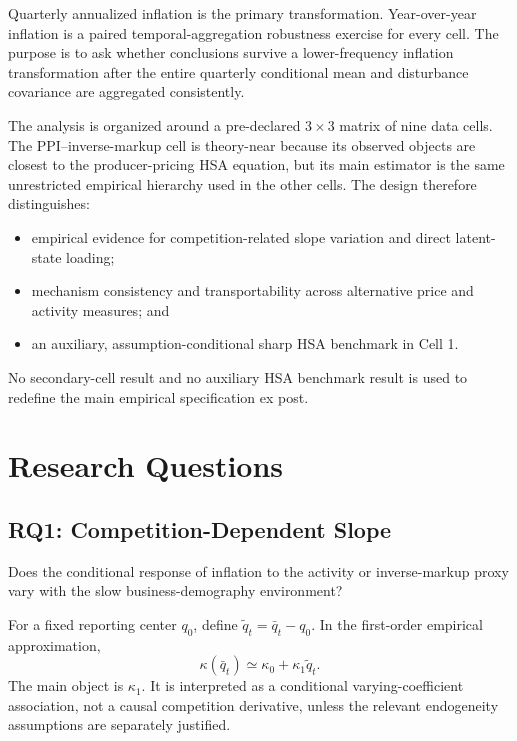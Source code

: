 \documentclass[11pt]{article}
\begin{document}
Quarterly annualized inflation is the primary transformation. Year-over-year inflation is a paired temporal-aggregation robustness exercise for every cell. The purpose is to ask whether conclusions survive a lower-frequency inflation transformation after the entire quarterly conditional mean and disturbance covariance are aggregated consistently.

The analysis is organized around a pre-declared \(3\times3\) matrix of nine data cells. The PPI--inverse-markup cell is theory-near because its observed objects are closest to the producer-pricing HSA equation, but its main estimator is the same unrestricted empirical hierarchy used in the other cells. The design therefore distinguishes:
\begin{itemize}
\item empirical evidence for competition-related slope variation and direct latent-state loading;
\item mechanism consistency and transportability across alternative price and activity measures; and
\item an auxiliary, assumption-conditional sharp HSA benchmark in Cell 1.
\end{itemize}

No secondary-cell result and no auxiliary HSA benchmark result is used to redefine the main empirical specification ex post.

\section{Research Questions}

\subsection{RQ1: Competition-Dependent Slope}

Does the conditional response of inflation to the activity or inverse-markup proxy vary with the slow business-demography environment?

For a fixed reporting center \(q_0\), define \(\tilde q_t=\bar q_t-q_0\). In the first-order empirical approximation,
\begin{equation}
\kappa(\bar q_t)\simeq \kappa_0+\kappa_1\tilde q_t.
\end{equation}
The main object is \(\kappa_1\). It is interpreted as a conditional varying-coefficient association, not a causal competition derivative, unless the relevant endogeneity assumptions are separately justified.
\end{document}
